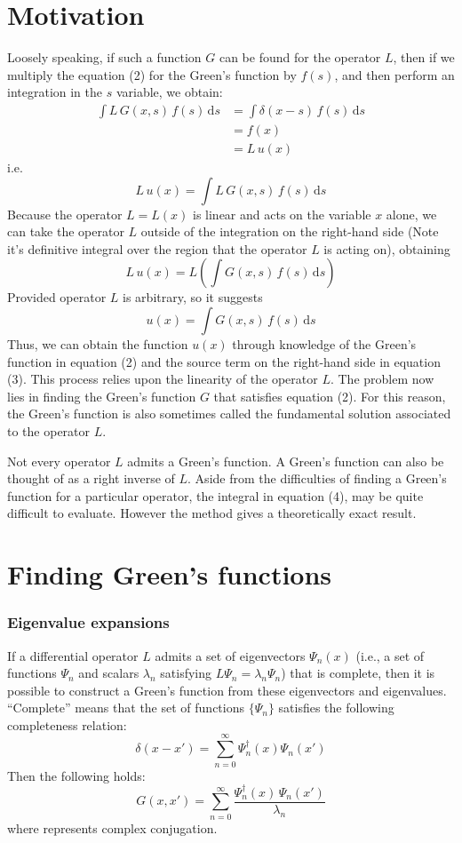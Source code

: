 \documentclass[a4paper]{article}
\begin{document}
\part{Motivation}
Loosely speaking, if such a function $G$ can be found for the operator $L$, then if we multiply the equation (2) for the Green's function by $f(s)$, and then perform an integration in the $s$ variable, we obtain:
\begin{align*}
\int L\,G(x,s)\,f(s)\,\mathrm{d}s&=\int \delta(x-s)\,f(s)\,\mathrm{d}s\\&=f(x)\\&=L\,u(x)
\end{align*}
i.e.
\[
L\,u(x)=\int L\,G(x,s)\,f(s)\,\mathrm{d}s
\]
Because the operator $L = L(x)$ is linear and acts on the variable $x$ alone, we can take the operator $L$ outside of the integration on the right-hand side (Note it's definitive integral over the region that the operator $L$ is acting on), obtaining
\[
L\,u(x)=L\left(\int G(x,s)\,f(s)\,\mathrm{d}s\right)
\]
Provided operator $L$ is arbitrary, so it suggests
\begin{equation}
u(x)=\int G(x,s)\,f(s)\,\mathrm{d}s
\end{equation}
Thus, we can obtain the function $u(x)$ through knowledge of the Green's function in equation (2) and the source term on the right-hand side in equation (3). This process relies upon the linearity of the operator $L$. The problem now lies in finding the Green's function $G$ that satisfies equation (2). For this reason, the Green's function is also sometimes called the fundamental solution associated to the operator $L$.

Not every operator $L$ admits a Green's function. A Green's function can also be thought of as a right inverse of $L$. Aside from the difficulties of finding a Green's function for a particular operator, the integral in equation (4), may be quite difficult to evaluate. However the method gives a theoretically exact result.
\part{Finding Green's functions}
\section{Eigenvalue expansions}
If a differential operator $L$ admits a set of eigenvectors $\Psi_{n}(x)$ (i.e., a set of functions $\Psi_{n}$ and scalars $\lambda_{n}$ satisfying $L\Psi_{n}=\lambda_{n}\Psi_{n}$) that is complete, then it is possible to construct a Green's function from these eigenvectors and eigenvalues.
``Complete'' means that the set of functions $\lbrace\Psi_{n}\rbrace$ satisfies the following completeness relation:
\begin{equation}
\delta(x-x')=\sum_{n=0}^\infty\Psi_n^\dag(x)\Psi_{n}(x')
\end{equation}
Then the following holds:
\begin{equation}
G(x,x')=\sum_{n=0}^\infty\frac{\Psi_{n}^\dag(x)\,\Psi_{n}(x')}{\lambda_{n}}
\end{equation}
where \dag represents complex conjugation.
\end{document}
